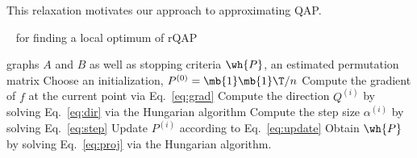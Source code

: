 This relaxation motivates our approach to approximating QAP.



\begin{algorithm}
	\caption{\FAQ~ for finding a local optimum of rQAP} \label{alg:1}
\begin{algorithmic}[1]
	\REQUIRE graphs $A$ and $B$ as well as stopping criteria
	\ENSURE $\wh{P}$, an estimated permutation matrix
	\STATE Choose an initialization, $P^{(0)}=\mb{1}\mb{1}\T/n$ \label{step:init} %
	\STATE Compute the gradient of $f$ at the current point via Eq.~\eqref{eq:grad}	
	\STATE Compute the direction $Q^{(i)}$ by solving Eq.~\eqref{eq:dir} via the Hungarian algorithm
	\STATE Compute the step size $\alpha^{(i)}$ by solving Eq.~\eqref{eq:step}
	\STATE Update $P^{(i)}$ according to Eq.~\eqref{eq:update}  %
	\ENDWHILE
	\STATE Obtain $\wh{P}$ by solving Eq.~\eqref{eq:proj} via the Hungarian algorithm.
\end{algorithmic}
\end{algorithm}



